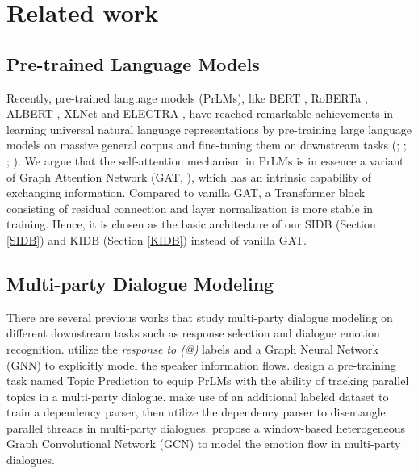 \documentclass[11pt]{article}
\begin{document}
	\section{Related work}
	\subsection{Pre-trained Language Models}
	Recently, pre-trained language models (PrLMs), like BERT \citep{devlin2019bert}, RoBERTa \citep{liu2019roberta}, ALBERT \citep{lan2019albert}, XLNet \citep{yang2019xlnet} and ELECTRA \citep{clark2020electra}, have reached remarkable achievements in learning universal natural language representations by pre-training large language models on massive general corpus and fine-tuning them on downstream tasks (\citealp{socher2013recursive}; \citealp{wang2018glue}; \citealp{wang2019superglue}; \citealp{lai2017race}). We argue that the self-attention mechanism \citep{vaswani2017attention} in PrLMs is in essence a variant of Graph Attention Network (GAT, \citealp{velivckovic2017graph}), which has an intrinsic capability of exchanging information. Compared to vanilla GAT, a Transformer block consisting of residual connection \citep{He_2016_CVPR} and layer normalization \citep{ba2016layer} is more stable in training. Hence, it is chosen as the basic architecture of our SIDB (Section \ref{SIDB}) and KIDB (Section \ref{KIDB}) instead of vanilla GAT.
	
	\subsection{Multi-party Dialogue Modeling}
	There are several previous works that study multi-party dialogue modeling on different downstream tasks such as response selection and dialogue emotion recognition. \citet{ijcai2019-696} utilize the \emph{response to (@)} labels and a Graph Neural Network (GNN) to explicitly model the speaker information flows. \citet{wang2020response} design a pre-training task named Topic Prediction to equip PrLMs with the ability of tracking parallel topics in a multi-party dialogue. \citet{jia2020multi} make use of an additional labeled dataset to train a dependency parser, then utilize the dependency parser to disentangle parallel threads in multi-party dialogues. \citet{ghosal2019dialoguegcn} propose a window-based heterogeneous Graph Convolutional Network (GCN) to model the emotion flow in multi-party dialogues.
	
\end{document}
